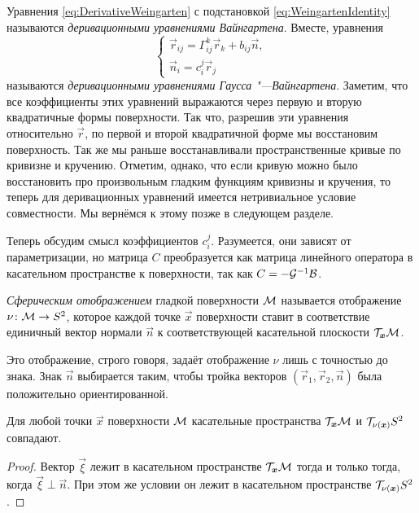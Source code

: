 Уравнения \eqref{eq:DerivativeWeingarten} с подстановкой \eqref{eq:WeingartenIdentity} называются \textit{деривационными уравнениями Вайнгартена}. Вместе, уравнения
\begin{equation} \label{eq:DerivativeEquations}
	\begin{cases}
		\vec{r}_{ij} = \Gamma_{ij}^k\vec{r}_k + b_{ij}\vec{n},\\
		\vec{n}_i = c^j_i\vec{r}_j
	\end{cases}
\end{equation}
называются \textit{деривационными уравнениями Гаусса "---Вайнгартена}. Заметим, что все коэффициенты этих уравнений выражаются через первую и вторую квадратичные формы поверхности. Так что, разрешив эти уравнения относительно $\vec{r}$, по первой и второй квадратичной форме мы восстановим поверхность. Так же мы раньше восстанавливали пространственные кривые по кривизне и кручению. Отметим, однако, что если кривую можно было восстановить про произвольным гладким функциям кривизны и кручения, то теперь для деривационных уравнений имеется нетривиальное условие совместности. Мы вернёмся к этому позже в следующем разделе.

Теперь обсудим смысл коэффициентов $c^j_i$. Разумеется, они зависят от параметризации, но матрица $C$ преобразуется как матрица линейного оператора в касательном пространстве к поверхности, так как $C = -\mathcal{G}^{-1}\mathcal{B}$.

\begin{definition}
	\textit{Сферическим отображением} гладкой поверхности $\mathcal{M}$ называется отображение $\nu\colon \mathcal{M} \to S^2$, которое каждой точке $\vec{x}$ поверхности ставит в соответствие единичный вектор нормали $\vec{n}$ к соответствующей касательной плоскости $\mathcal{T}_{\boldsymbol{x}}\mathcal{M}$.
\end{definition}

Это отображение, строго говоря, задаёт отображение $\nu$ лишь с точностью до знака. Знак $\vec{n}$ выбирается таким, чтобы тройка векторов $(\vec{r}_1, \vec{r}_2, \vec{n})$ была положительно ориентированной.

\begin{proposition}
	Для любой точки $\vec{x}$ поверхности $\mathcal{M}$ касательные пространства $\mathcal{T}_{\boldsymbol{x}}\mathcal{M}$ и $\mathcal{T}_{\nu(\boldsymbol{x})}S^2$ совпадают.
\end{proposition}

\begin{proof}
	Вектор $\vec{\xi}$ лежит в касательном пространстве $\mathcal{T}_{\boldsymbol{x}}\mathcal{M}$ тогда и только тогда, когда $\vec{\xi} \perp \vec{n}$. При этом же условии он лежит в касательном пространстве $\mathcal{T}_{\nu(\boldsymbol{x})}S^2$.
\end{proof}

